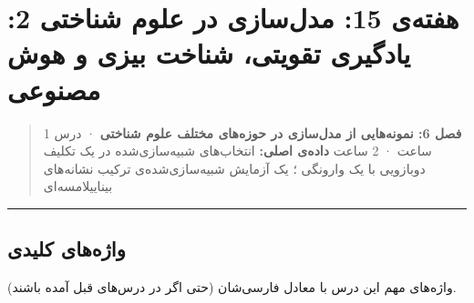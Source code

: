 \section{هفته‌ی 15: مدل‌سازی در علوم شناختی 2: یادگیری تقویتی، شناخت بیزی
و هوش مصنوعی}

\begin{quote}
\textbf{فصل 6: نمونه‌هایی از مدل‌سازی در حوزه‌های مختلف علوم شناختی} · درس
1 ساعت ·  2 ساعت \textbf{داده‌ی اصلی:} انتخاب‌های شبیه‌سازی‌شده در
یک تکلیف  دوبازویی با یک وارونگی ؛ یک آزمایش
شبیه‌سازی‌شده‌ی ترکیب نشانه‌های بینایی\lr{--}لامسه‌ای 
\end{quote}

\begin{center}\rule{0.5\linewidth}{0.5pt}\end{center}

\subsection{واژه‌های کلیدی}

واژه‌های مهم این درس با معادل فارسی‌شان (حتی اگر در درس‌های قبل آمده
باشند).

